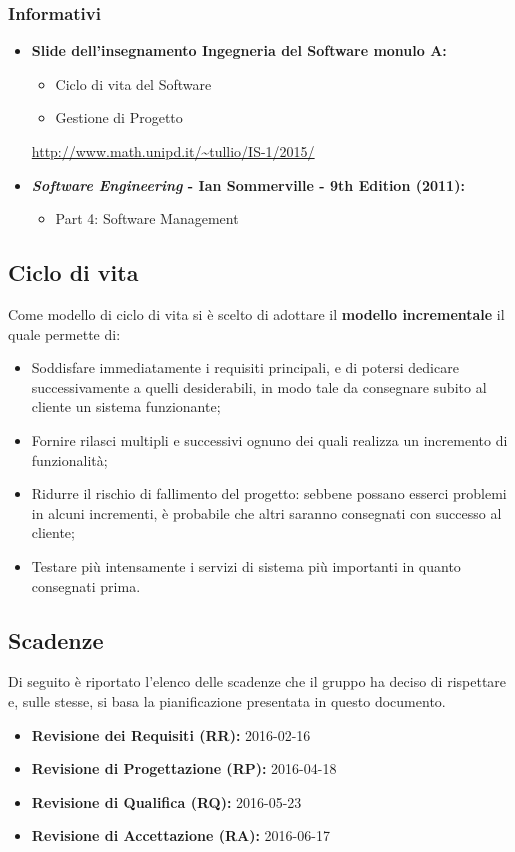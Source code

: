 \subsubsection{Informativi}
\begin{itemize}
\item \textbf{Slide dell'insegnamento Ingegneria del Software monulo A:}
\begin{itemize}
\item Ciclo di vita del Software
\item Gestione di Progetto
\end{itemize}
\url{http://www.math.unipd.it/~tullio/IS-1/2015/}
\item \textbf{\textit{Software Engineering} - Ian Sommerville - 9th Edition (2011):}
\begin{itemize}
\item Part 4: Software Management
\end{itemize} 
\end{itemize}

\subsection{Ciclo di vita}
Come modello di ciclo di vita si è scelto di adottare il \textbf{modello incrementale} il quale permette di:
\begin{itemize}
\item Soddisfare immediatamente i requisiti principali, e di potersi dedicare successivamente a quelli desiderabili, in modo tale da consegnare subito al cliente un sistema funzionante;
\item Fornire rilasci multipli e successivi ognuno dei quali realizza un incremento di funzionalità;
\item Ridurre il rischio di fallimento del progetto: sebbene possano esserci problemi in alcuni incrementi, è probabile che altri saranno consegnati con successo al cliente;
\item Testare più intensamente i servizi di sistema più importanti in quanto consegnati prima.
\end{itemize}

\subsection{Scadenze}
Di seguito è riportato l'elenco delle scadenze che il gruppo \GroupName{} ha deciso di rispettare e, sulle stesse, si basa la pianificazione presentata in questo documento.
\begin{itemize}
\item \textbf{Revisione dei Requisiti (RR):} 2016-02-16
\item \textbf{Revisione di Progettazione (RP):} 2016-04-18
\item \textbf{Revisione di Qualifica (RQ):} 2016-05-23
\item \textbf{Revisione di Accettazione (RA):} 2016-06-17
\end{itemize}

